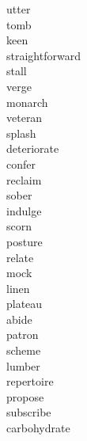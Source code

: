 \documentclass[a4paper, 11pt]{ctexart}
\begin{document}
\begin{multicols*}{3}
\begin{description}
\item[utter]

\item[tomb]

\item[keen]

\item[straightforward]

\item[stall]

\item[verge]

\item[monarch]

\item[veteran]

\item[splash]

\item[deteriorate]

\item[confer]

\item[reclaim]

\item[sober]

\item[indulge]

\item[scorn]

\item[posture]

\item[relate]

\item[mock]

\item[linen]

\item[plateau]

\item[abide]

\item[patron]

\item[scheme]

\item[lumber]

\item[repertoire]

\item[propose]

\item[subscribe]

\item[carbohydrate]


\end{description}
\end{multicols*}
\end{document}
